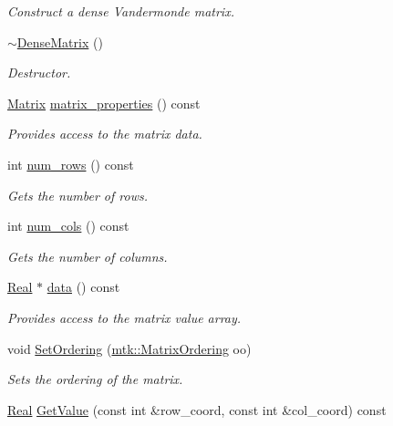 \begin{DoxyCompactItemize}
\begin{DoxyCompactList}\small\item\em Construct a dense Vandermonde matrix. \end{DoxyCompactList}\item 
\hyperlink{classmtk_1_1DenseMatrix_a8d4a0df33bd4e4edf5d2fe5539885b85}{$\sim$\-Dense\-Matrix} ()
\begin{DoxyCompactList}\small\item\em Destructor. \end{DoxyCompactList}\item 
\hyperlink{classmtk_1_1Matrix}{Matrix} \hyperlink{classmtk_1_1DenseMatrix_abb5e4db5688743c6f9fd9ec6e38ed4ca}{matrix\-\_\-properties} () const 
\begin{DoxyCompactList}\small\item\em Provides access to the matrix data. \end{DoxyCompactList}\item 
int \hyperlink{classmtk_1_1DenseMatrix_a17d8d3b9cc0926044b6972dd190a5c21}{num\-\_\-rows} () const 
\begin{DoxyCompactList}\small\item\em Gets the number of rows. \end{DoxyCompactList}\item 
int \hyperlink{classmtk_1_1DenseMatrix_af6f78373aaf2136f0c78974d7c8de0a8}{num\-\_\-cols} () const 
\begin{DoxyCompactList}\small\item\em Gets the number of columns. \end{DoxyCompactList}\item 
\hyperlink{group__c01-roots_gac080bbbf5cbb5502c9f00405f894857d}{Real} $\ast$ \hyperlink{classmtk_1_1DenseMatrix_a16b3ff56feb2658b9fc7147d1de4d8e7}{data} () const 
\begin{DoxyCompactList}\small\item\em Provides access to the matrix value array. \end{DoxyCompactList}\item 
void \hyperlink{classmtk_1_1DenseMatrix_aacae136ae446cad8f0d81476e83efb39}{Set\-Ordering} (\hyperlink{group__c02-enums_ga622801bd9f912d0f976c3e383f5f581c}{mtk\-::\-Matrix\-Ordering} oo)
\begin{DoxyCompactList}\small\item\em Sets the ordering of the matrix. \end{DoxyCompactList}\item 
\hyperlink{group__c01-roots_gac080bbbf5cbb5502c9f00405f894857d}{Real} \hyperlink{classmtk_1_1DenseMatrix_a87fb785713c04b13767947cc3325ce7c}{Get\-Value} (const int \&row\-\_\-coord, const int \&col\-\_\-coord) const 

\end{DoxyCompactItemize}

